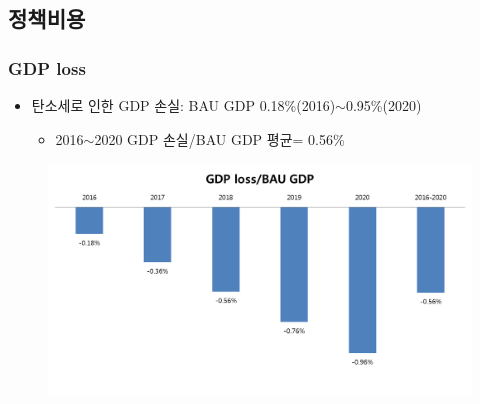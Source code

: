 \documentclass[10pt,compress,slidetop,%
			   hyperref={unicode},xcolor={svgnames},%
			   t]{beamer}
\begin{document}
\subsection{정책비용}

\begin{frame}
	\frametitle{GDP loss}
	\begin{itemize}
\item{탄소세로 인한 GDP 손실: BAU GDP 0.18\%(2016)$\sim$0.95\%(2020)}
	\begin{itemize}
		\item {2016$\sim$2020 GDP 손실/BAU GDP 평균= 0.56\%}
		\end{itemize} 	
	\end{itemize}
	\begin{figure}
		\centering
		\includegraphics[width=1.00\textwidth]{GDPloss.png}
	\end{figure}
\end{frame}
\end{document}
